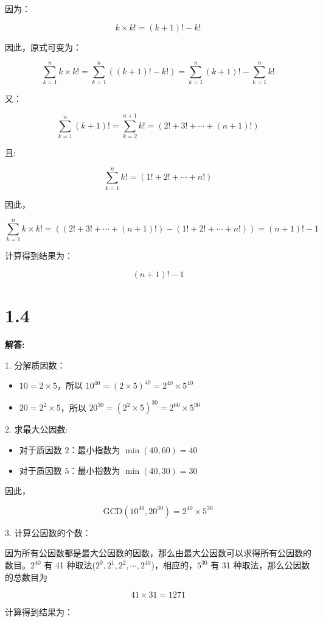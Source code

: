 \documentclass{article}
\begin{document}
因为：

\[
k \times k! = (k + 1)! - k!
\]

因此，原式可变为：

\[
\sum_{k=1}^{n} k \times k! = \sum_{k=1}^{n} \left( (k+1)! - k! \right) = \sum_{k=1}^{n} (k+1)! - \sum_{k=1}^{n} k!
\]

又：

\[
\sum_{k=1}^{n} (k+1)! = \sum_{k=2}^{n+1} k! = (2! + 3! + \cdots + (n+1)!)
\]

且:

\[
\sum_{k=1}^{n} k! = (1! + 2! + \cdots + n!)
\]

因此，

\[
\sum_{k=1}^{n} k \times k! = \left( (2! + 3! + \cdots + (n+1)!) - (1! + 2! + \cdots + n!) \right) = (n+1)! - 1
\]

计算得到结果为：

\[
\boxed{(n+1)! - 1}
\]

\section*{1.4}
\textbf{解答:}

1. 分解质因数：

\begin{itemize}
    \item $10 = 2 \times 5$，所以 $10^{40} = (2 \times 5)^{40} = 2^{40} \times 5^{40}$
    \item $20 = 2^2 \times 5$，所以 $20^{30} = (2^2 \times 5)^{30} = 2^{60} \times 5^{30}$
\end{itemize}

2. 求最大公因数:

\begin{itemize}
    \item 对于质因数 $2$：最小指数为 $\min(40, 60) = 40$
    \item 对于质因数 $5$：最小指数为 $\min(40, 30) = 30$
\end{itemize}

因此，

\[
\text{GCD}(10^{40}, 20^{30}) = 2^{40} \times 5^{30}
\]

3. 计算公因数的个数：

因为所有公因数都是最大公因数的因数，那么由最大公因数可以求得所有公因数的数目。$2^{40}$ 有 41 种取法($2^0, 2^1, 2^2, \cdots, 2^{40}$)，相应的，$5^{30}$ 有 31 种取法，那么公因数的总数目为

\[
41 \times 31 = 1271
\]

计算得到结果为：
\end{document}
